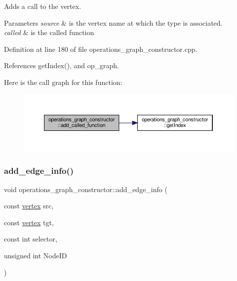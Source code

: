 Adds a call to the vertex. 


\begin{DoxyParams}{Parameters}
{\em source} & is the vertex name at which the type is associated. \\
\hline
{\em called} & is the called function \\
\hline
\end{DoxyParams}


Definition at line 180 of file operations\+\_\+graph\+\_\+constructor.\+cpp.



References get\+Index(), and op\+\_\+graph.

Here is the call graph for this function\+:
\nopagebreak
\begin{figure}[H]
\begin{center}
\leavevmode
\includegraphics[width=350pt]{d7/d2f/classoperations__graph__constructor_ac5826ccd6edc3ddb2ba4d1a5e695f809_cgraph}
\end{center}
\end{figure}
\mbox{\label{classoperations__graph__constructor_a92acb720c7197a91ae01ccdf364e9c88}} 
\subsubsection{\texorpdfstring{add\+\_\+edge\+\_\+info()}{add\_edge\_info()}}
{\footnotesize\ttfamily void operations\+\_\+graph\+\_\+constructor\+::add\+\_\+edge\+\_\+info (\begin{DoxyParamCaption}\item[{const \hyperlink{graph_8hpp_abefdcf0544e601805af44eca032cca14}{vertex}}]{src,  }\item[{const \hyperlink{graph_8hpp_abefdcf0544e601805af44eca032cca14}{vertex}}]{tgt,  }\item[{const int}]{selector,  }\item[{unsigned int}]{Node\+ID }\end{DoxyParamCaption})}



